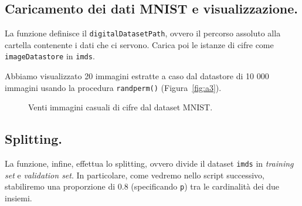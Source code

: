 \documentclass[a4paper,12pt]{article}
\begin{document}
\subsection{Caricamento dei dati MNIST e visualizzazione.} La funzione definisce il \texttt{di\-gi\-tal\-Da\-ta\-set\-Path}, ovvero il percorso assoluto alla cartella contenente i dati che ci servono. Carica poi le istanze di cifre come \texttt{imageDatastore} in \texttt{imds}.

Abbiamo visualizzato 20 immagini estratte a caso dal datastore di 10 000 immagini usando la procedura \texttt{randperm()} (Figura~\vref{fig:a3}).

\begin{figure}[htb]
    \centering
    \caption{Venti immagini casuali di cifre dal dataset MNIST.}
    \label{fig:a3}
\end{figure}

\subsection{Splitting.} La funzione, infine, effettua lo splitting, ovvero divide il dataset \texttt{imds} in \emph{training set} e \emph{validation set}. In particolare, come vedremo nello script successivo, stabiliremo una proporzione di $0.8$ (specificando \texttt{p}) tra le cardinalità dei due insiemi.
\end{document}
